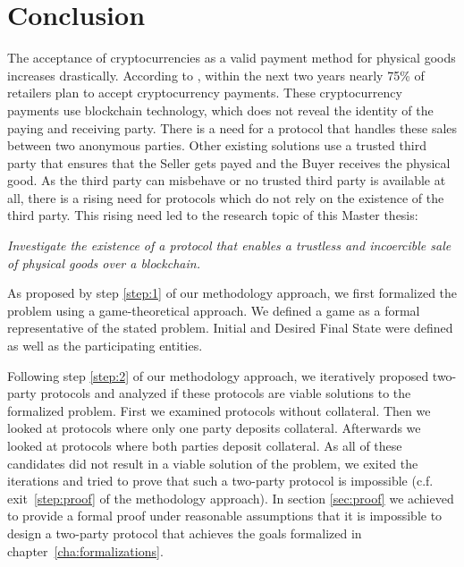 \documentclass{cacthesis}
\begin{document}
\chapter{Conclusion}
\label{cha:conclusion}
The acceptance of cryptocurrencies as a valid payment method for physical goods increases drastically. According to \cite{crypto-acceptance}, within the next two years nearly 75\% of retailers plan to accept cryptocurrency payments. These cryptocurrency payments use blockchain technology, which does not reveal the identity of the paying and receiving party. There is a need for a protocol that handles these sales between two anonymous parties. Other existing solutions use a trusted third party that ensures that the Seller gets payed and the Buyer receives the physical good. As the third party can misbehave or no trusted third party is available at all, there is a rising need for protocols which do not rely on the existence of the third party. This rising need led to the research topic of this Master thesis:\newline

\emph{Investigate the existence of a protocol that enables a trustless and incoercible sale of physical goods over a blockchain.}\newline

 As proposed by step \ref{step:1} of our methodology approach, we first formalized the problem using a game-theoretical approach. We defined a game as a formal representative of the stated problem. Initial and Desired Final State were defined as well as the participating entities.\newline
 
 Following step \ref{step:2} of our methodology approach, we iteratively proposed two-party protocols and analyzed if these protocols are viable solutions to the formalized problem. First we examined protocols without collateral. Then we looked at protocols where only one party deposits collateral.
 Afterwards we looked at protocols where both parties deposit collateral. As all of these candidates did not result in a viable solution of the problem, we exited the iterations and tried to prove that such a two-party protocol is impossible (c.f. exit~\ref{step:proof} of the methodology approach). In section \ref{sec:proof} we achieved to provide a formal proof under reasonable assumptions that it is impossible to design a two-party protocol that achieves the goals formalized in chapter~\ref{cha:formalizations}.\newline
 
\end{document}
